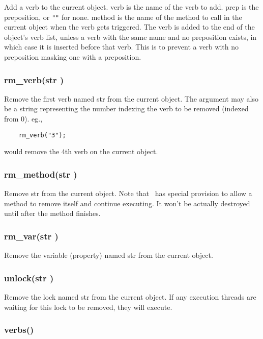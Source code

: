 Add a verb to the current object.  {\funcarg verb } is the name of the verb
to add.  {\funcarg prep } is the preposition, or \verb+""+ for none.
{\funcarg method } is the name of the method to call in the current
object when the verb gets triggered.  The verb is added to the end of
the object's verb list, unless a verb with the same name and no
preposition exists, in which case it is inserted before that verb.
This is to prevent a verb with no preposition masking one with
a preposition.

\subsubsection{\func rm\_verb({\funcarg str })}

Remove the first verb named {\funcarg str } from the current object. 
The argument may also be a string representing the number indexing the
verb to be removed (indexed from 0).  eg.,
\begin{verbatim}
	rm_verb("3");
\end{verbatim}
would remove the 4th verb on the current object.

\subsubsection{\func rm\_method({\funcarg str })}

Remove {\funcarg str } from the current object.  Note that \COOLMUD\
has special provision to allow a method to remove itself and continue
executing.  It won't be actually destroyed until after the method finishes.

\subsubsection{\func rm\_var({\funcarg str })}

Remove the variable (property) named {\funcarg str } from the current object.

\subsubsection{\func unlock({\funcarg str })}

Remove the lock named {\funcarg str } from the current object.  If any
execution threads are waiting for this lock to be removed, they will
execute.

\subsubsection{\func verbs()}

